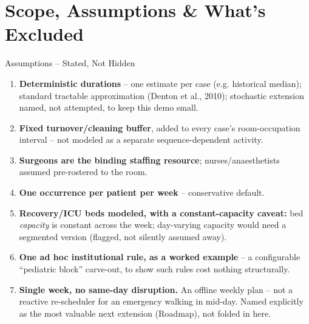 \documentclass[aspectratio=169]{beamer}
\begin{document}
\section{Scope, Assumptions \& What's Excluded}

\begin{frame}{Assumptions -- Stated, Not Hidden}
  \begin{enumerate}
    \footnotesize
    \item \textbf{Deterministic durations} -- one estimate per case (e.g. historical
      median); standard tractable approximation (Denton et al., 2010); stochastic
      extension named, not attempted, to keep this demo small.
    \item \textbf{Fixed turnover/cleaning buffer}, added to every case's room-occupation
      interval -- not modeled as a separate sequence-dependent activity.
    \item \textbf{Surgeons are the binding staffing resource}; nurses/anaesthetists
      assumed pre-rostered to the room.
    \item \textbf{One occurrence per patient per week} -- conservative default.
    \item \textbf{Recovery/ICU beds modeled, with a constant-capacity caveat:} bed
      \emph{capacity} is constant across the week; day-varying capacity would need a
      segmented version (flagged, not silently assumed away).
    \item \textbf{One ad hoc institutional rule, as a worked example} -- a configurable
      ``pediatric block'' carve-out, to show such rules cost nothing structurally.
    \item \textbf{Single week, no same-day disruption.} An offline weekly plan -- not a
      reactive re-scheduler for an emergency walking in mid-day. Named explicitly as
      the most valuable next extension (Roadmap), not folded in here.
  \end{enumerate}
\end{frame}
\end{document}
